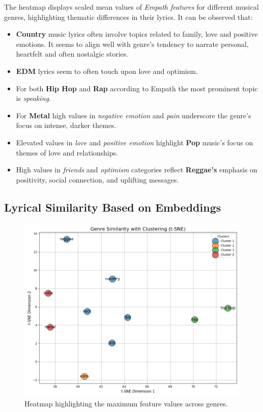 The heatmap displays scaled mean values of \textit{Empath features} for
different musical genres, highlighting thematic  differences in their lyrics.
It can be observed that:
\begin{itemize}
  \item \textbf{Country} music lyrics often involve topics related to family,
    love and  positive emotions. It seems to align well with genre's tendency
    to narrate personal, heartfelt and often nostalgic stories.
  \item \textbf{EDM} lyrics seem to often touch upon love and optimism.
  \item For both \textbf{Hip Hop} and \textbf{Rap} according to Empath  the
    most prominent topic is \textit{speaking}.
  \item For \textbf{Metal} high values in \textit{negative emotion} and
    \textit{pain} underscore the genre's focus on intense, darker themes.
  \item Elevated values in \textit{love} and \textit{positive emotion}
    highlight \textbf{Pop} music’s focus on themes of love and relationships.
  \item High values in \textit{friends } and \textit{optimism} categories
    reflect \textbf{Reggae's} emphasis on positivity, social connection, and
    uplifting messages.
\end{itemize}

\subsection{Lyrical Similarity Based on Embeddings}
\begin{center}
\begin{figure}[H]
  \centering
  \includegraphics[width=6in]{img/tsne_genres.png}
  \caption{Heatmap highlighting the maximum feature values across genres.}
  \label{Figure:dendrogram_spotify_features}
\end{figure}
\end{center}

